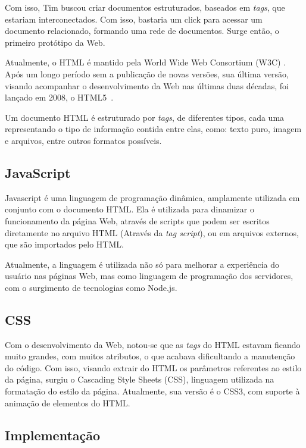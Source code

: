 Com isso, Tim buscou criar documentos estruturados, baseados em \textit{
tags}, que estariam interconectados. Com isso, bastaria um click para acessar um documento relacionado, formando uma rede de documentos. Surge então, o primeiro protótipo da Web.

Atualmente, o HTML é mantido pela World Wide Web Consortium (W3C) . Após um longo período sem a publicação de novas versões, sua última versão, visando acompanhar o desenvolvimento da Web nas últimas duas décadas, foi lançado em 2008, o HTML5~\cite{htmlw3cs}.  

Um documento HTML é estruturado por \textit{tags}, de diferentes tipos, cada uma representando o tipo de informação contida entre elas, como: texto puro, imagem e arquivos, entre outros formatos possíveis.


\subsection{JavaScript}

Javascript é uma linguagem de programação dinâmica, amplamente utilizada em conjunto com o documento HTML. Ela é utilizada para dinamizar o funcionamento da página Web, através de scripts que podem ser escritos diretamente no arquivo HTML (Através da \textit{tag script}), ou em arquivos externos, que são importados pelo HTML.

Atualmente, a linguagem é utilizada não só para melhorar a experiência do usuário nas páginas Web, mas como linguagem de programação dos servidores, com o surgimento de tecnologias como Node.js.

\subsection{CSS}

Com o desenvolvimento da Web, notou-se que as \textit{tags} do HTML estavam ficando muito grandes, com muitos atributos, o que acabava dificultando a manutenção do código. Com isso, visando extrair do HTML os parâmetros referentes ao estilo da página, surgiu o Cascading Style Sheets (CSS), linguagem utilizada na formatação do estilo da página. Atualmente, sua versão é o CSS3, com suporte à animação de elementos do HTML.

\subsection{Implementação}

